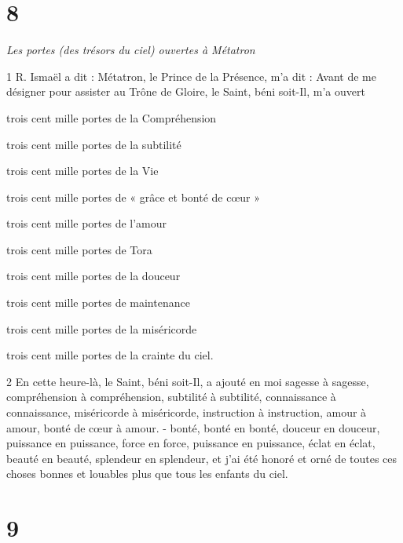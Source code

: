 \chapter{8}

\par \textit{Les portes (des trésors du ciel) ouvertes à Métatron}

\par 1 R. Ismaël a dit : Métatron, le Prince de la Présence, m'a dit : Avant de me désigner pour assister au Trône de Gloire, le Saint, béni soit-Il, m'a ouvert

\par trois cent mille portes de la Compréhension

\par trois cent mille portes de la subtilité

\par trois cent mille portes de la Vie

\par trois cent mille portes de « grâce et bonté de cœur »

\par trois cent mille portes de l'amour

\par trois cent mille portes de Tora

\par trois cent mille portes de la douceur

\par trois cent mille portes de maintenance

\par trois cent mille portes de la miséricorde

\par trois cent mille portes de la crainte du ciel.

\par 2 En cette heure-là, le Saint, béni soit-Il, a ajouté en moi sagesse à sagesse, compréhension à compréhension, subtilité à subtilité, connaissance à connaissance, miséricorde à miséricorde, instruction à instruction, amour à amour, bonté de cœur à amour. - bonté, bonté en bonté, douceur en douceur, puissance en puissance, force en force, puissance en puissance, éclat en éclat, beauté en beauté, splendeur en splendeur, et j'ai été honoré et orné de toutes ces choses bonnes et louables plus que tous les enfants du ciel.


\chapter{9}

